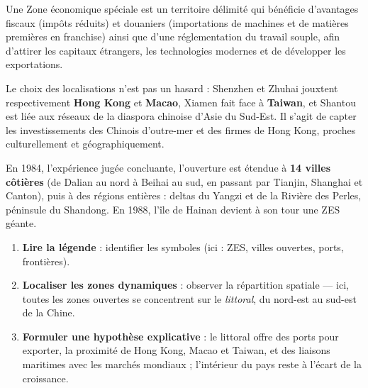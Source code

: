 \documentclass[11pt]{article}
\newcommand{\cle}[1]{{\popxbold\color{popdark}#1}}
\begin{document}
\begin{definition}
Une \cle{Zone économique spéciale} est un territoire délimité qui bénéficie d'avantages fiscaux (impôts réduits) et douaniers (importations de machines et de matières premières en franchise) ainsi que d'une réglementation du travail souple, afin d'attirer les capitaux étrangers, les technologies modernes et de développer les exportations.
\end{definition}

Le choix des localisations n'est pas un hasard : Shenzhen et Zhuhai jouxtent respectivement \textbf{Hong Kong} et \textbf{Macao}, Xiamen fait face à \textbf{Taiwan}, et Shantou est liée aux réseaux de la diaspora chinoise d'Asie du Sud-Est. Il s'agit de capter les investissements des Chinois d'outre-mer et des firmes de Hong Kong, proches culturellement et géographiquement.

En \cle{1984}, l'expérience jugée concluante, l'ouverture est étendue à \textbf{14 villes côtières} (de Dalian au nord à Beihai au sud, en passant par Tianjin, Shanghai et Canton), puis à des régions entières : deltas du Yangzi et de la Rivière des Perles, péninsule du Shandong. En 1988, l'île de Hainan devient à son tour une ZES géante.

\begin{methode}
\begin{enumerate}
\item \textbf{Lire la légende} : identifier les symboles (ici : ZES, villes ouvertes, ports, frontières).
\item \textbf{Localiser les zones dynamiques} : observer la répartition spatiale — ici, toutes les zones ouvertes se concentrent sur le \emph{littoral}, du nord-est au sud-est de la Chine.
\item \textbf{Formuler une hypothèse explicative} : le littoral offre des ports pour exporter, la proximité de Hong Kong, Macao et Taiwan, et des liaisons maritimes avec les marchés mondiaux ; l'intérieur du pays reste à l'écart de la croissance.
\end{enumerate}
\end{methode}
\end{document}
